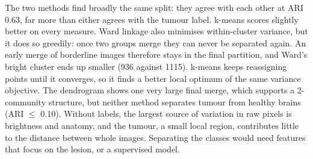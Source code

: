\documentclass[11pt]{article}
\begin{document}
The two methods find broadly the same split: they agree with each other at ARI 0.63, far more than either agrees with the tumour label. k-means
scores slightly better on every measure. Ward linkage also minimises within-cluster variance, but it does so greedily: once two groups merge
they can never be separated again. An early merge of borderline images therefore stays in the final partition, and Ward's bright cluster ends up smaller (936 against 1115).
k-means keeps reassigning points until it converges, so it finds a better local optimum of the same variance objective. The dendrogram shows one very large final
merge, which supports a 2-community structure, but neither method separates tumour from healthy brains (ARI $\le$ 0.10). Without labels, the
largest source of variation in raw pixels is brightness and anatomy, and the tumour, a small local region, contributes little to the
distance between whole images. Separating the classes would need features that focus on the lesion, or a supervised model.
\end{document}
